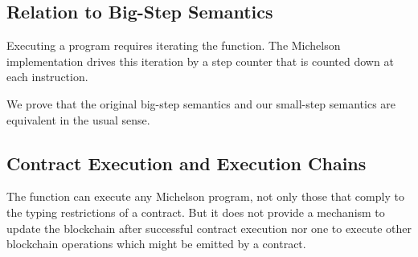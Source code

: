 \subsection{Relation to Big-Step Semantics}
\label{sec:relation-big-step}


Executing a program requires iterating the 
function. The Michelson implementation drives this iteration
by a step counter that is counted
down at each instruction.
\ConcreteprogStepStar

We prove that the original big-step semantics and our small-step
semantics are equivalent in the usual sense.
\BigstepToSmallstep
\BigstepFromSmallstep

\subsection{Contract Execution and Execution Chains}\label{sec:contract-execution}

The  function can execute any Michelson program, not only those that comply
to the typing restrictions of a contract.
But it does not provide a mechanism to update the blockchain after successful contract execution
nor one to execute other blockchain operations which might be emitted by a contract.

\begin{comment}
When a contract execution terminates, the final stack interpretation will contain a pair
of a list of blockchain operations to be emitted by the contract as well as the updated
storage value of the contract.
Also contract execution is triggered by transfering some amount of Tezos tokens to it,
so it's balance and storage has to be updated and the emitted operations
must be staged for execution.
\end{comment}


